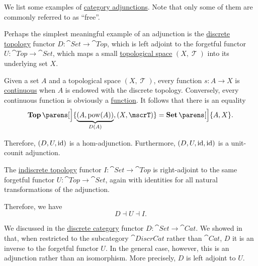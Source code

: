 \begin{example}\label{ex:def:category_adjunction}
  We list some examples of \hyperref[def:category_adjunction]{category adjunctions}. Note that only some of them are commonly referred to as \enquote{free}.

  \begin{thmenum}
     Perhaps the simplest meaningful example of an adjunction is the \hyperref[def:discrete_topology]{discrete topology} functor \( D: \cat{Set} \to \cat{Top} \), which is left adjoint to the forgetful functor \( U: \cat{Top} \to \cat{Set} \), which maps a small \hyperref[def:topological_space]{topological space} \( (X, \mscrT) \) into its underlying set \( X \).

    Given a set \( A \) and a topological space \( (X, \mscrT) \), every function \( s: A \to X \) is \hyperref[def:global_continuity]{continuous} when \( A \) is endowed with the discrete topology. Conversely, every continuous function is obviously a \hyperref[def:function]{function}. It follows that there is an equality
    \begin{equation*}
      \cat{Top}\parens[\Big]{ \underbrace{(A, \pow(A))}_{D(A)}, (X, \mscrT) } = \cat{Set}\parens[\Big]{ A, X }.
    \end{equation*}

    Therefore, \( (D, U, \operatorname{id}) \) is a hom-adjunction. Furthermore, \( (D, U, \operatorname{id}, \operatorname{id}) \) is a unit-counit adjunction.

     The \hyperref[def:indiscrete_topology]{indiscrete topology} functor \( I: \cat{Set} \to \cat{Top} \) is right-adjoint to the same forgetful functor \( U: \cat{Top} \to \cat{Set} \), again with identities for all natural transformations of the adjunction.

    Therefore, we have
    \begin{equation*}
      D \dashv U \dashv I.
    \end{equation*}

     We discussed in  the \hyperref[def:discrete_category]{discrete category} functor \( D: \cat{Set} \to \cat{Cat} \). We showed in  that, when restricted to the subcategory \( \cat{DiscrCat} \) rather than \( \cat{Cat} \), \( D \) it is an inverse to the forgetful functor \( U \). In the general case, however, this is an adjunction rather than an isomorphism. More precisely, \( D \) is left adjoint to \( U \).


\end{thmenum}
\end{example}
